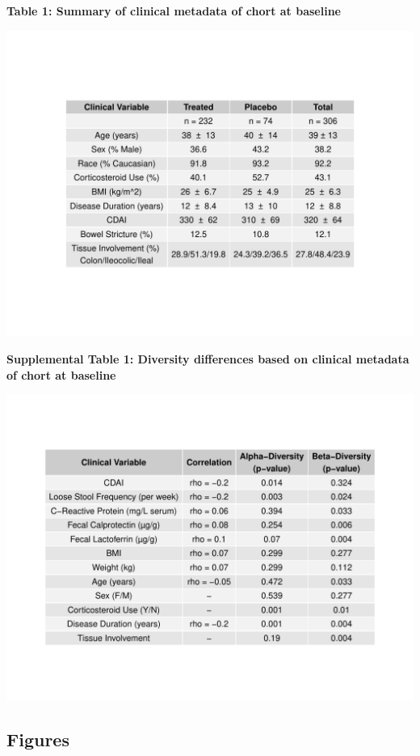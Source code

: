 \documentclass[11pt,]{article}
\begin{document}
\textbf{Table 1: Summary of clinical metadata of chort at baseline}

\includegraphics{tables/Table1_baseline_metadata.pdf}

\newpage

\textbf{Supplemental Table 1: Diversity differences based on clinical
metadata of chort at baseline}

\includegraphics{tables/Supp.table1_cohortdiversity.pdf}

\newpage

\subsection{Figures}\label{figures}
\end{document}
